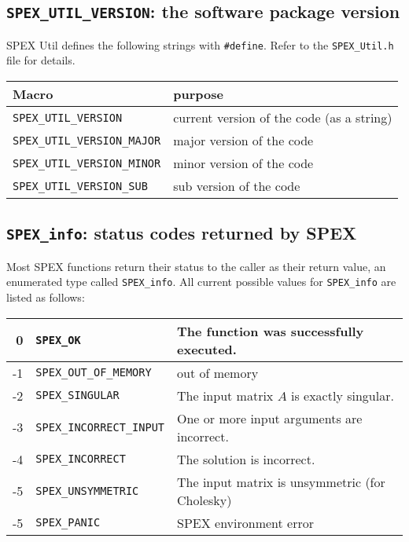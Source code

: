 \documentclass[12pt]{report}
\theoremstyle{definition}
\begin{document}
\cprotect\subsection{\verb|SPEX_UTIL_VERSION|: the software package version}

SPEX Util defines the following strings with \verb|#define|. Refer to
the \verb|SPEX_Util.h| file for details.

\begin{center}
\begin{tabular}{ll}
\hline
Macro & purpose \\
\hline
\verb|SPEX_UTIL_VERSION|       & current version of the code (as a string)\\
\verb|SPEX_UTIL_VERSION_MAJOR| & major version of the code\\
\verb|SPEX_UTIL_VERSION_MINOR| & minor version of the code   \\
\verb|SPEX_UTIL_VERSION_SUB|   & sub version of the code\\
\hline
\end{tabular}
\end{center}

\cprotect\subsection{\verb|SPEX_info|: status codes returned by SPEX}
\label{ss:SPEX_info}

Most SPEX functions return their status to the caller as their return value,
an enumerated type called \verb|SPEX_info|. All current possible values for
\verb|SPEX_info| are listed as follows:

\begin{center}
\begin{tabular}{rll}
\hline
    0& \verb|SPEX_OK|& The function was successfully executed.\\
\hline
    -1& \verb|SPEX_OUT_OF_MEMORY|& out of memory\\
\hline
    -2& \verb|SPEX_SINGULAR|& The input matrix $A$ is exactly singular.\\
\hline
    -3& \verb|SPEX_INCORRECT_INPUT|& One or more input arguments are incorrect.\\
\hline
    -4& \verb|SPEX_INCORRECT|& The solution is incorrect.\\
\hline
    -5& \verb|SPEX_UNSYMMETRIC|& The input matrix is unsymmetric (for Cholesky)\\
\hline
    -5& \verb|SPEX_PANIC| & SPEX environment error \\
\hline
\end{tabular}
\end{center}
\end{document}
